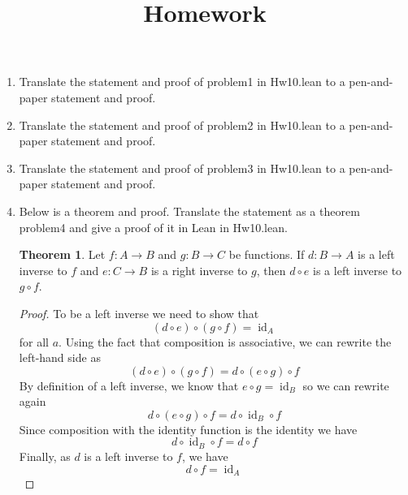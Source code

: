 \documentclass[12pt]{amsart}
\theoremstyle{definition}
\newtheorem*{theorem*}{Theorem}
\begin{document}
\title{Homework}

\maketitle

\begin{enumerate}
	\item Translate the statement and proof of problem1 in Hw10.lean to 
		a pen-and-paper statement and proof. 

	\item Translate the statement and proof of problem2 in Hw10.lean to 
		a pen-and-paper statement and proof. 

	\item Translate the statement and proof of problem3 in Hw10.lean to 
		a pen-and-paper statement and proof. 

	\item Below is a theorem and proof. Translate the statement as a 
		theorem problem4 and give a proof of it in Lean in Hw10.lean. 

	\begin{theorem*}
		Let $f : A \to B$ and $g : B \to C$ be 
		functions. If $d : B \to A$ is a left inverse to $f$ and  
		$e : C \to B$ is a right inverse to $g$, then $d \circ e$ is a left 
		inverse to $g \circ f$. 
	\end{theorem*}
		
	\begin{proof}
		To be a left inverse we need to show that 
		\begin{displaymath}
			(d \circ e) \circ (g \circ f) = \operatorname{id}_A 
		\end{displaymath}
		for all $a$. Using the fact that composition is associative, 
		we can rewrite the left-hand side as 
		\begin{displaymath}
			(d \circ e) \circ (g \circ f)  = d \circ (e \circ g) \circ f
		\end{displaymath}
		By definition of a left inverse, we know that $e \circ g = 
		\operatorname{id}_B$ so we can rewrite again 
		\begin{displaymath}
			d \circ (e \circ g) \circ f = d \circ \operatorname{id}_B 
			\circ f 
		\end{displaymath}
		Since composition with the identity function is the identity we 
		have 
		\begin{displaymath}
			d \circ \operatorname{id}_B \circ f = d \circ f 
		\end{displaymath}
		Finally, as $d$ is a left inverse to $f$, we have 
		\begin{displaymath}
			d \circ f = \operatorname{id}_A
		\end{displaymath}
	\end{proof}
		

\end{enumerate}
\end{document}
